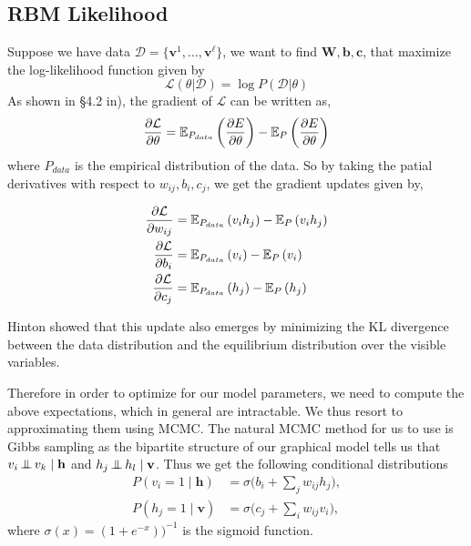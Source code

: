 \subsection{RBM Likelihood}
Suppose we have data $\mathcal{D}=\{\textbf{v}^1,\dots,\textbf{v}^\ell\}$, we want to find $\textbf{W},\textbf{b}, \textbf{c}$, that maximize the log-likelihood function given by 
\[\mathcal{L}(\theta|\mathcal{D})=\log P(\mathcal{D}|\theta)\]
As shown in \S 4.2 in\cite{fischer2014training}), the gradient of $\mathcal{L}$ can be written as,
\begin{equation}\label{LL_grad}
\frac{\partial \mathcal{L}}{\partial\theta}={\mathbb{E}}_{P_{data}}\left(\frac{\partial E}{\partial \theta}\right)-{\mathbb{E}}_P\left(\frac{\partial E}{\partial \theta}\right)
\end{equation}
where $P_{data}$ is the empirical distribution of the data. So by taking the patial derivatives with respect to $w_{ij}, b_i,c_j$, we get the gradient updates given by,

\begin{align*}
\frac{\partial \mathcal{L}}{\partial w_{ij}}&={\mathbb{E}}_{P_{data}}\left(v_ih_j\right)-{\mathbb{E}}_P\left(v_ih_j\right)\\
\frac{\partial \mathcal{L}}{\partial b_i}&={\mathbb{E}}_{P_{data}}\left(v_i\right)-{\mathbb{E}}_P\left(v_i\right)\\
\frac{\partial \mathcal{L}}{\partial c_j}&={\mathbb{E}}_{P_{data}}\left(h_j\right)-{\mathbb{E}}_P\left(h_j\right)
\end{align*}

Hinton \cite{hinton2002training} showed that this update also emerges by minimizing the KL divergence between the data distribution and the equilibrium distribution over the visible variables.

Therefore in order to optimize for our model parameters, we need to compute the above expectations, which in general are intractable. We thus resort to approximating them using MCMC. The natural MCMC method for us to use is Gibbs sampling as the bipartite structure of our graphical model tells us that  $v_i \operatorname{\perp\hspace{-.6em}\perp} v_k \mid \mathbf{h}$ and $h_j \operatorname{\perp\hspace{-.6em}\perp} h_l \mid \mathbf{v}$. Thus we get the following conditional distributions
\begin{align}\label{RBM_gibbs_update}
	P(v_i = 1 \mid \mathbf{h}) &= \sigma\Big( b_i + \textstyle{\sum_j} w_{ij}h_j \Big), \\
	P(h_j = 1 \mid \mathbf{v}) &= \sigma\Big( c_j + \textstyle{\sum_i} w_{ij}v_i \Big),
\end{align}
where $\sigma(x)=(1+e^{-x}))^{-1}$ is the sigmoid function.

